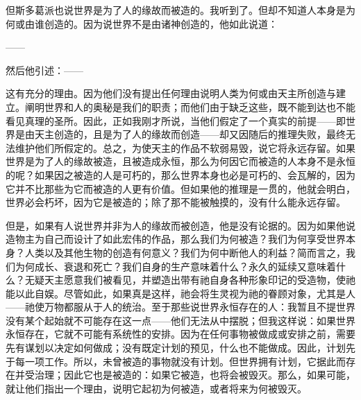 但斯多葛派也说世界是为了人的缘故而被造的。我听到了。但却不知道人本身是为何或由谁创造的。因为说世界不是由诸神创造的，他如此说道：\par

——\par

然后他引述：——\par

\par

这有充分的理由。因为他们没有提出任何理由说明人类为何或由天主所创造与建立。阐明世界和人的奥秘是我们的职责；而他们由于缺乏这些，既不能到达也不能看见真理的圣所。因此，正如我刚才所说，当他们假定了一个真实的前提——即世界是由天主创造的，且是为了人的缘故而创造——却又因随后的推理失败，最终无法维护他们所假定的。总之，为使天主的作品不软弱易毁，说它将永远存留。如果世界是为了人的缘故被造，且被造成永恒，那么为何因它而被造的人本身不是永恒的呢？如果因之被造的人是可朽的，那么世界本身也必是可朽的、会瓦解的，因为它并不比那些为它而被造的人更有价值。但如果他的推理是一贯的，他就会明白，世界必会朽坏，因为它是被造的；除了那不能被触摸的，没有什么能永远存留。\par

但是，如果有人说世界并非为人的缘故而被创造，他是没有论据的。因为如果他说造物主为自己而设计了如此宏伟的作品，那么我们为何被造？我们为何享受世界本身？人类以及其他生物的创造有何意义？我们为何中断他人的利益？简而言之，我们为何成长、衰退和死亡？我们自身的生产意味着什么？永久的延续又意味着什么？无疑天主愿意我们被看见，并塑造出带有祂自身各种形象印记的受造物，使祂能以此自娱。尽管如此，如果真是这样，祂会将生灵视为祂的眷顾对象，尤其是人——祂使万物都服从于人的统治。至于那些说世界永恒存在的人：我暂且不提世界没有某个起始就不可能存在这一点——他们无法从中摆脱；但我这样说：如果世界永恒存在，它就不可能有系统性的安排。因为在任何事物被做成或安排之前，需要先有谋划以决定如何做成；没有既定计划的预见，什么也不能做成。因此，计划先于每一项工作。所以，未曾被造的事物就没有计划。但世界拥有计划，它据此而存在并受治理；因此它也是被造的：如果它被造，也将会被毁灭。那么，如果可能，就让他们指出一个理由，说明它起初为何被造，或者将来为何被毁灭。\par

